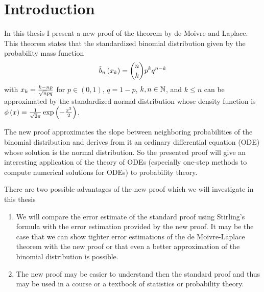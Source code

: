 \chapter{Introduction}

In this thesis I present a new proof of the theorem by de Moivre and Laplace. This theorem states that the standardized binomial distribution given by the probability mass function
\begin{align}
  \bb{\x} = \binom nk p^k q^{n-k}
\end{align}
with $\x[k] = \frac{k-np}{\sqrt npq}$ for $p\in (0,1)$, $q=1-p$, $k,n\in\N$, and $k\le n$ can be approximated by the standardized normal distribution whose density function is $\fphi{x} = \frac{1}{\sqrt 2\pi} \fexp{-\frac{x^2}2}$.

The new proof approximates the slope between neighboring probabilities of the binomial distribution and derives from it an ordinary differential equation (ODE) whose solution is the normal distribution. So the presented proof will give an interesting application of the theory of ODEs (especially one-step methods to compute numerical solutions for ODEs) to probability theory.

There are two possible advantages of the new proof which we will investigate in this thesis

\begin{enumerate}
  \item We will compare the error estimate of the standard proof using Stirling's formula with the error estimation provided by the new proof. It may be the case that we can show tighter error estimations of the de Moivre-Laplace theorem with the new proof or that even a better approximation of the binomial distribution is possible.

  \item The new proof may be easier to understand then the standard proof and thus may be used in a course or a textbook of statistics or probability theory.
\end{enumerate}
